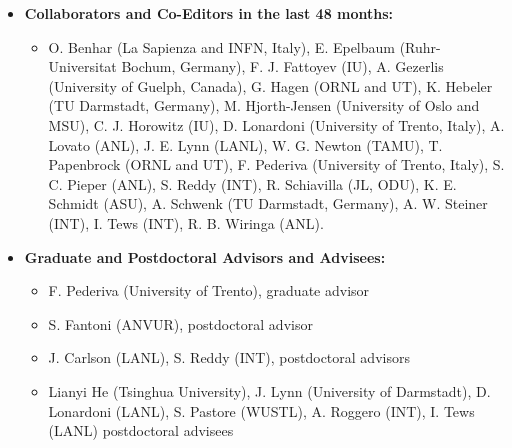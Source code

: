 \documentclass[11pt]{article}
\begin{document}
\begin{itemize}
\item{\bf Collaborators and Co-Editors in the last 48 months:}
\begin{itemize}
\item
O. Benhar (La Sapienza and INFN, Italy),
E. Epelbaum (Ruhr-Universitat Bochum, Germany),
F. J. Fattoyev (IU),
A. Gezerlis (University of Guelph, Canada),
G. Hagen (ORNL and UT),
K. Hebeler (TU Darmstadt, Germany),
M. Hjorth-Jensen (University of Oslo and MSU),
C. J. Horowitz (IU),
D. Lonardoni (University of Trento, Italy),
A. Lovato (ANL),
J. E. Lynn (LANL),
W. G. Newton (TAMU),
T. Papenbrock (ORNL and UT),
F. Pederiva (University of Trento, Italy),
S. C. Pieper (ANL),
S. Reddy (INT),
R. Schiavilla (JL, ODU),
K. E. Schmidt (ASU),
A. Schwenk (TU Darmstadt, Germany),
A. W. Steiner (INT),
I. Tews (INT),
R. B. Wiringa (ANL).
\end{itemize}

\item{\bf Graduate and Postdoctoral Advisors and Advisees:}
\begin{itemize}
\item F. Pederiva (University of Trento), graduate advisor
\item S. Fantoni (ANVUR), postdoctoral advisor
\item J. Carlson (LANL), S. Reddy (INT), postdoctoral advisors
\item Lianyi He (Tsinghua University), J. Lynn (University of Darmstadt), 
D. Lonardoni (LANL), S. Pastore (WUSTL), A. Roggero (INT), I. Tews (LANL) postdoctoral advisees
\end{itemize}


\end{itemize}
 
\end{document}
